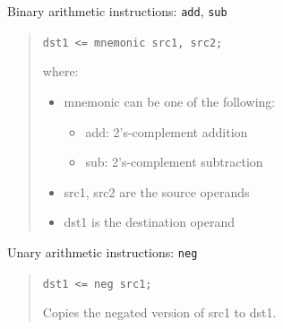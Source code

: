 \documentclass[a4paper]{article}
\begin{document}
Binary arithmetic instructions: \texttt{add}, \texttt{sub}
%
\begin{quote}

\texttt{dst1 <= mnemonic src1, src2;}

where:
%
\begin{itemize}

\item mnemonic can be one of the following:
%
\begin{itemize}

\item add: 2's-complement addition

\item sub: 2's-complement subtraction

\end{itemize}

\item src1, src2 are the source operands

\item dst1 is the destination operand

\end{itemize}

\end{quote}

Unary arithmetic instructions: \texttt{neg}
%
\begin{quote}

\texttt{dst1 <= neg src1;}

Copies the negated version of src1 to dst1.

\end{quote}
\end{document}

